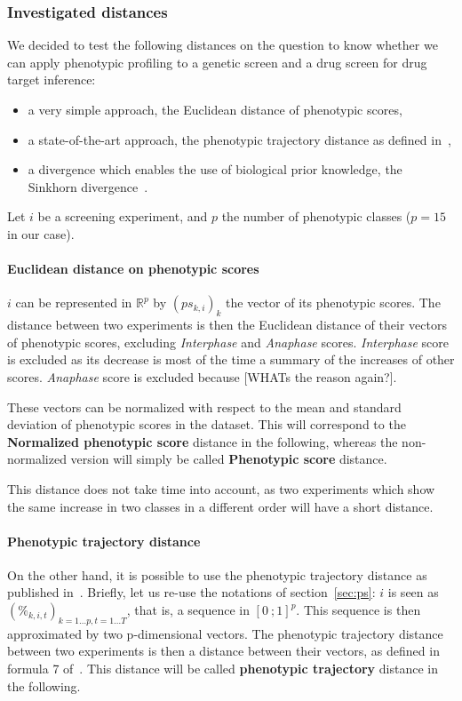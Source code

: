 \subsubsection{Investigated distances}
We decided to test the following distances on the question to know whether we can apply phenotypic profiling to a genetic screen and a drug screen for drug target inference:
\begin{itemize}
\item a very simple approach, the Euclidean distance of phenotypic scores, 
\item a state-of-the-art approach, the phenotypic trajectory distance as defined in~\cite{Walter2010},
\item a divergence which enables the use of biological prior knowledge, the Sinkhorn divergence~\cite{sinkhorn}.
\end{itemize}

Let $i$ be a screening experiment, and $p$ the number of phenotypic classes ($p=15$ in our case). 
\paragraph{Euclidean distance on phenotypic scores}
$i$ can be represented in $\mathbb{R}^p$ by $(ps_{k,i})_k$ the vector of its phenotypic scores. The distance between two experiments is then the Euclidean distance of their vectors of phenotypic scores, excluding \textit{Interphase} and \textit{Anaphase} scores. \textit{Interphase} score is excluded as its decrease is most of the time a summary of the increases of other scores. \textit{Anaphase} score is excluded because [WHATs the reason again?]. 

These vectors can be normalized with respect to the mean and standard deviation of phenotypic scores in the dataset. This will correspond to the \textbf{Normalized phenotypic score} distance in the following, whereas the non-normalized version will simply be called \textbf{Phenotypic score} distance.

This distance does not take time into account, as two experiments which show the same increase in two classes in a different order will have a short distance.

\paragraph{Phenotypic trajectory distance}
On the other hand, it is possible to use the phenotypic trajectory distance as published in~\cite{Walter2010}. Briefly, let us re-use the notations of section~\ref{sec:ps}: $i$ is seen as $(\%_{k,i,t})_{k=1\ldots p,t=1\ldots T}$, that is, a sequence in $[0~;1]^p$. This sequence is then approximated by two p-dimensional vectors. The phenotypic trajectory distance between two experiments is then a distance between their vectors, as defined in formula 7 of~\cite{Walter2010}. This distance will be called \textbf{phenotypic trajectory} distance in the following.

